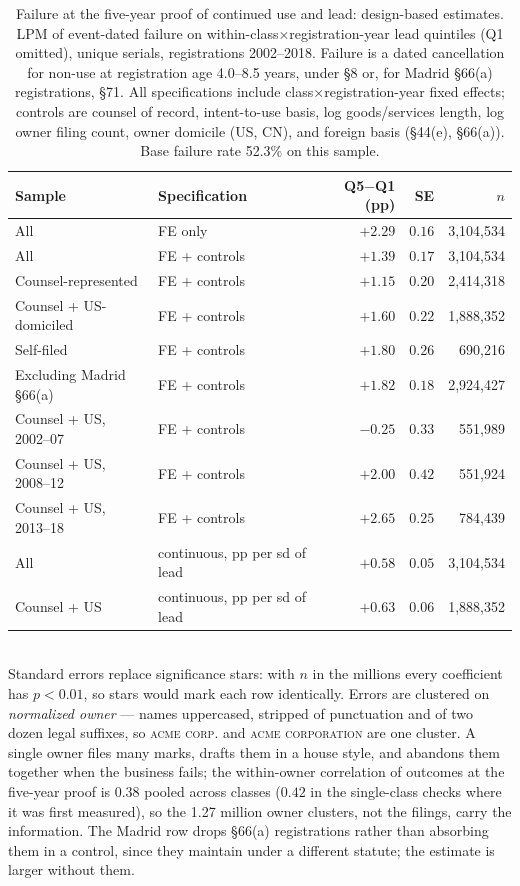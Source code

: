 \begin{table}[h]\centering\small
\caption{Failure at the five-year proof of continued use and lead:
design-based estimates. LPM of event-dated failure on
within-class$\times$registration-year lead quintiles (Q1 omitted), unique
serials, registrations 2002--2018. Failure is a dated cancellation for
non-use at registration age 4.0--8.5 years, under \S8 or, for Madrid
\S66(a) registrations, \S71. All specifications include
class$\times$registration-year fixed effects; controls are counsel of
record, intent-to-use basis, log goods/services length, log owner filing
count, owner domicile (US, CN), and foreign basis (\S44(e), \S66(a)).
Base failure rate 52.3\% on this sample.}
\label{tab:gate_lpm}
\begin{tabular}{llrrr}
\toprule
Sample & Specification & Q5$-$Q1 (pp) & SE & $n$ \\
\midrule
All & FE only & $+2.29$ & $0.16$ & 3{,}104{,}534 \\
All & FE + controls & $+1.39$ & $0.17$ & 3{,}104{,}534 \\
Counsel-represented & FE + controls & $+1.15$ & $0.20$ & 2{,}414{,}318 \\
Counsel + US-domiciled & FE + controls & $+1.60$ & $0.22$ & 1{,}888{,}352 \\
Self-filed & FE + controls & $+1.80$ & $0.26$ & 690{,}216 \\
Excluding Madrid \S66(a) & FE + controls & $+1.82$ & $0.18$ & 2{,}924{,}427 \\
\midrule
Counsel + US, 2002--07 & FE + controls & $-0.25$ & $0.33$ & 551{,}989 \\
Counsel + US, 2008--12 & FE + controls & $+2.00$ & $0.42$ & 551{,}924 \\
Counsel + US, 2013--18 & FE + controls & $+2.65$ & $0.25$ & 784{,}439 \\
\midrule
All & continuous, pp per sd of lead & $+0.58$ & $0.05$ & 3{,}104{,}534 \\
Counsel + US & continuous, pp per sd of lead & $+0.63$ & $0.06$ & 1{,}888{,}352 \\
\bottomrule
\end{tabular}
\\[0.3em]\footnotesize Standard errors replace significance stars: with
$n$ in the millions every coefficient has $p < 0.01$, so stars would mark
each row identically. Errors are clustered on \emph{normalized owner} ---
names uppercased, stripped of punctuation and of two dozen legal suffixes,
so \textsc{acme corp.} and \textsc{acme corporation} are one cluster. A
single owner files many marks, drafts them in a house style, and abandons
them together when the business fails; the within-owner correlation of
outcomes at the five-year proof is $0.38$ pooled across classes ($0.42$ in
the single-class checks where it was first measured), so the 1.27 million
owner clusters, not the filings, carry the information. The Madrid row
drops \S66(a) registrations rather than absorbing them in a control, since
they maintain under a different statute; the estimate is larger without
them.
\end{table}

